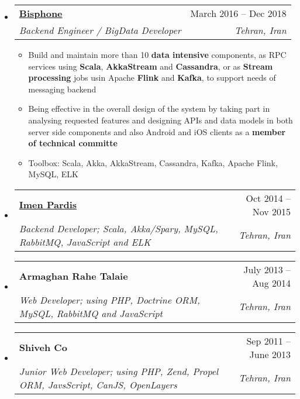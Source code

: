 \documentclass[letterpaper,12pt]{article}[leftmargin=*]
\makeatletter
\def \entryspacing {-0pt}
\newcommand{\resumeEntryStart}{\begin{itemize}[leftmargin=2.5mm]}
\newcommand{\resumeEntryEnd}{\end{itemize}\vspace{\entryspacing}}
\newcommand{\resumeItemListStart}{\begin{itemize}[leftmargin=4.5mm]}
\newcommand{\resumeItemListEnd}{\end{itemize}}
\newcommand{\resumeItem}[1]{
  \item\small{
    {#1 \vspace{-2pt}}
  }
}
\newcommand{\resumeEntryTSDL}[4]{
  \vspace{-1pt}\item[]
    \begin{tabular*}{0.97\textwidth}{l@{\extracolsep{\fill}}r}
      \textbf{\color{primary}#1} & {\firabook\color{accent}\small#2} \\
      \textit{\color{accent}\small#3} & \textit{\color{accent}\small#4} \\
    \end{tabular*}\vspace{-6pt}
}
\makeatother
\begin{document}

  \resumeEntryStart
    \resumeEntryTSDL
      {\href{http://bisphone.com}{Bisphone}}{March 2016 -- Dec 2018}
      {Backend Engineer / BigData Developer}{Tehran, Iran}
    \resumeItemListStart
      \resumeItem{Build and maintain more than 10 \textbf{data intensive} components, as RPC services using \textbf{Scala}, \textbf{AkkaStream} and \textbf{Cassandra}, or as \textbf{Stream processing} jobs usin Apache \textbf{Flink} and \textbf{Kafka}, to support needs of messaging backend}
      \resumeItem{Being effective in the overall design of the system by taking part in analysing requested features and designing APIs and data models in both server side components and also Android and iOS clients as a \textbf{member of technical committe}}
      \resumeItem{Toolbox: Scala, Akka, AkkaStream, Cassandra, Kafka, Apache Flink, MySQL, ELK}
    \resumeItemListEnd
  \resumeEntryEnd


  \resumeEntryStart
    \resumeEntryTSDL
	  {\href{https://imenpardis.com/fa/}{Imen Pardis}}{Oct 2014 -- Nov 2015}
      {Backend Developer; Scala, Akka/Spary, MySQL, RabbitMQ, JavaScript and ELK}{Tehran, Iran}
  \resumeEntryEnd

\vspace{-13pt} %

  \resumeEntryStart
    \resumeEntryTSDL
      {Armaghan Rahe Talaie}{July 2013 -- Aug 2014}
      {Web Developer; using PHP, Doctrine ORM, MySQL, RabbitMQ and JavaScript}{Tehran, Iran}
  \resumeEntryEnd

\vspace{-13pt} %

  \resumeEntryStart
    \resumeEntryTSDL
      {Shiveh Co}{Sep 2011 -- June 2013}
      {Junior Web Developer; using PHP, Zend, Propel ORM, JavsScript, CanJS, OpenLayers}{Tehran, Iran}
  \resumeEntryEnd
\end{document}
